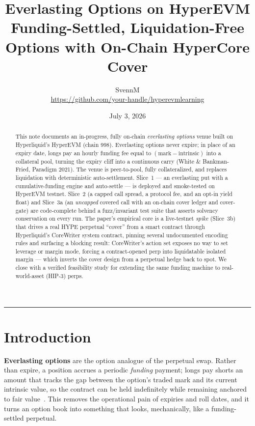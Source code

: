 \documentclass[11pt]{article}
\title{\textbf{Everlasting Options on HyperEVM}\\[2pt]
\large Funding-Settled, Liquidation-Free Options with On-Chain HyperCore Cover}
\author{SvennM\\[2pt]\small\url{https://github.com/your-handle/hyperevmlearning}}
\date{July 3, 2026}
\begin{document}
\maketitle

\begin{abstract}
\noindent
This note documents an in-progress, fully on-chain \emph{everlasting options} venue built on
Hyperliquid's HyperEVM (chain 998). Everlasting options never expire; in place of an expiry date,
longs pay an hourly funding fee equal to $(\text{mark}-\text{intrinsic})$ into a collateral pool,
turning the expiry cliff into a continuous carry (White \& Bankman-Fried, Paradigm 2021). The venue
is peer-to-pool, fully collateralized, and replaces liquidation with deterministic auto-settlement.
Slice~1 --- an everlasting put with a cumulative-funding engine and auto-settle --- is deployed and
smoke-tested on HyperEVM testnet. Slice~2 (a capped call spread, a protocol fee, and an opt-in yield
float) and Slice~3a (an \emph{uncapped} covered call with an on-chain cover ledger and cover-gate)
are code-complete behind a fuzz/invariant test suite that asserts solvency conservation on every
run. The paper's empirical core is a live-testnet \emph{spike} (Slice~3b) that drives a real HYPE
perpetual ``cover'' from a smart contract through Hyperliquid's CoreWriter system contract, pinning
several undocumented encoding rules and surfacing a blocking result: CoreWriter's action set exposes
no way to set leverage or margin mode, forcing a contract-opened perp into liquidatable isolated
margin --- which inverts the cover design from a perpetual hedge back to spot. We close with a
verified feasibility study for extending the same funding machine to real-world-asset (HIP-3) perps.
\end{abstract}

\tableofcontents
\vspace{1em}
\hrule

\section{Introduction}

\textbf{Everlasting options} are the option analogue of the perpetual swap. Rather than expire, a
position accrues a periodic \emph{funding} payment; longs pay shorts an amount that tracks the gap
between the option's traded mark and its current intrinsic value, so the contract can be held
indefinitely while remaining anchored to fair value~\cite{paradigm}. This removes the operational
pain of expiries and roll dates, and it turns an option book into something that looks, mechanically,
like a funding-settled perpetual.
\end{document}

